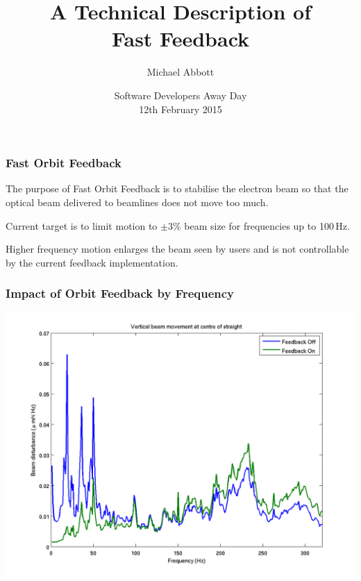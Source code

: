 \documentclass{beamer}
\title[Fast Feedback]{A Technical Description of\\Fast Feedback}
\author{Michael Abbott}
\date{Software Developers Away Day\\ 12th February 2015}
\begin{document}
\begin{frame}
\titlepage
\end{frame}



%
\begin{frame}\frametitle{Fast Orbit Feedback}

The purpose of Fast Orbit Feedback is to stabilise the electron beam so that the
optical beam delivered to beamlines does not move too much.

\medskip

Current target is to limit motion to $\pm 3\%$ beam size for frequencies up to
100\,Hz.

\medskip

Higher frequency motion enlarges the beam seen by users and is not controllable
by the current feedback implementation.

\end{frame}


%
\begin{frame}\frametitle{Impact of Orbit Feedback by Frequency}
\includegraphics[width=\linewidth]{fb-on-off}
\end{frame}
\end{document}

